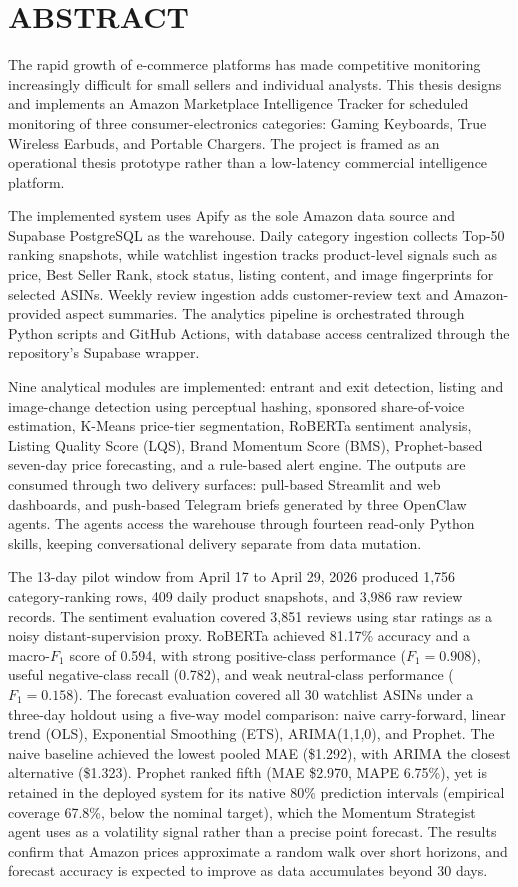 \chapter*{ABSTRACT}

The rapid growth of e-commerce platforms has made competitive monitoring increasingly difficult for small sellers and individual analysts. This thesis designs and implements an Amazon Marketplace Intelligence Tracker for scheduled monitoring of three consumer-electronics categories: Gaming Keyboards, True Wireless Earbuds, and Portable Chargers. The project is framed as an operational thesis prototype rather than a low-latency commercial intelligence platform.

The implemented system uses Apify as the sole Amazon data source and Supabase PostgreSQL as the warehouse. Daily category ingestion collects Top-50 ranking snapshots, while watchlist ingestion tracks product-level signals such as price, Best Seller Rank, stock status, listing content, and image fingerprints for selected ASINs. Weekly review ingestion adds customer-review text and Amazon-provided aspect summaries. The analytics pipeline is orchestrated through Python scripts and GitHub Actions, with database access centralized through the repository's Supabase wrapper.

Nine analytical modules are implemented: entrant and exit detection, listing and image-change detection using perceptual hashing, sponsored share-of-voice estimation, K-Means price-tier segmentation, RoBERTa sentiment analysis, Listing Quality Score (LQS), Brand Momentum Score (BMS), Prophet-based seven-day price forecasting, and a rule-based alert engine. The outputs are consumed through two delivery surfaces: pull-based Streamlit and web dashboards, and push-based Telegram briefs generated by three OpenClaw agents. The agents access the warehouse through fourteen read-only Python skills, keeping conversational delivery separate from data mutation.

The 13-day pilot window from April 17 to April 29, 2026 produced 1,756 category-ranking rows, 409 daily product snapshots, and 3,986 raw review records. The sentiment evaluation covered 3,851 reviews using star ratings as a noisy distant-supervision proxy. RoBERTa achieved 81.17\% accuracy and a macro-$F_1$ score of 0.594, with strong positive-class performance ($F_1 = 0.908$), useful negative-class recall (0.782), and weak neutral-class performance ($F_1 = 0.158$). The forecast evaluation covered all 30 watchlist ASINs under a three-day holdout using a five-way model comparison: naive carry-forward, linear trend (OLS), Exponential Smoothing (ETS), ARIMA(1,1,0), and Prophet. The naive baseline achieved the lowest pooled MAE (\$1.292), with ARIMA the closest alternative (\$1.323). Prophet ranked fifth (MAE \$2.970, MAPE 6.75\%), yet is retained in the deployed system for its native 80\% prediction intervals (empirical coverage 67.8\%, below the nominal target), which the Momentum Strategist agent uses as a volatility signal rather than a precise point forecast. The results confirm that Amazon prices approximate a random walk over short horizons, and forecast accuracy is expected to improve as data accumulates beyond 30 days.

